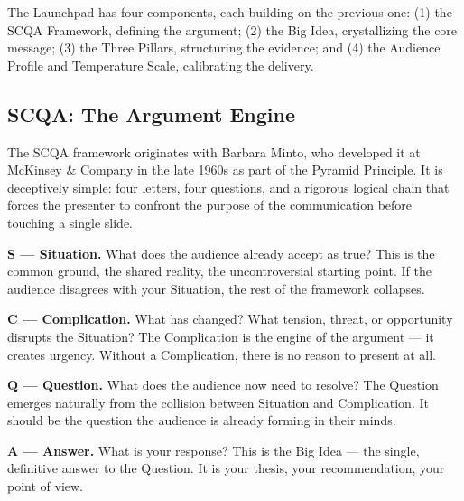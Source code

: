 The Launchpad has four components, each building on the previous one: (1) the SCQA Framework, defining the argument; (2) the Big Idea, crystallizing the core message; (3) the Three Pillars, structuring the evidence; and (4) the Audience Profile and Temperature Scale, calibrating the delivery.

\subsection{SCQA: The Argument Engine}

The SCQA framework originates with Barbara Minto, who developed it at McKinsey \& Company in the late 1960s as part of the Pyramid Principle. It is deceptively simple: four letters, four questions, and a rigorous logical chain that forces the presenter to confront the purpose of the communication before touching a single slide.

\textbf{S --- Situation.} What does the audience already accept as true? This is the common ground, the shared reality, the uncontroversial starting point. If the audience disagrees with your Situation, the rest of the framework collapses.

\textbf{C --- Complication.} What has changed? What tension, threat, or opportunity disrupts the Situation? The Complication is the engine of the argument --- it creates urgency. Without a Complication, there is no reason to present at all.

\textbf{Q --- Question.} What does the audience now need to resolve? The Question emerges naturally from the collision between Situation and Complication. It should be the question the audience is already forming in their minds.

\textbf{A --- Answer.} What is your response? This is the Big Idea --- the single, definitive answer to the Question. It is your thesis, your recommendation, your point of view.


